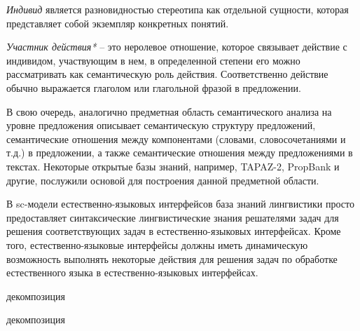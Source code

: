 \textit{Индивид} является разновидностью стереотипа как отдельной сущности, которая представляет собой  экземпляр конкретных понятий. 

\textit{Участник действия*} -- это неролевое отношение, которое связывает действие с индивидом, участвующим в нем, в определенной степени его можно рассматривать как семантическую роль действия. Соответственно действие обычно выражается глаголом или глагольной фразой в предложении.

В свою очередь, аналогично предметная область семантического анализа на уровне предложения описывает семантическую структуру предложений, семантические отношения между компонентами (словами, словосочетаниями и т.д.) в предложении, а также семантические отношения между предложениями в текстах. Некоторые открытые базы знаний, например, TAPAZ-2, PropBank и другие, послужили основой для построения данной предметной области.

В sc-модели естественно-языковых интерфейсов база знаний лингвистики просто предоставляет синтаксические лингвистические знания решателями задач для решения соответствующих задач в естественно-языковых интерфейсах. Кроме того, естественно-языковые интерфейсы должны иметь динамическую возможность выполнять некоторые действия для решения задач по обработке естественного языка в естественно-языковых интерфейсах. 
\begin{SCn}
	\begin{scnrelfromset}{декомпозиция}
	\end{scnrelfromset}
\end{SCn}

\begin{SCn}
	\begin{scnrelfromset}{декомпозиция}
	\end{scnrelfromset}
\end{SCn}

